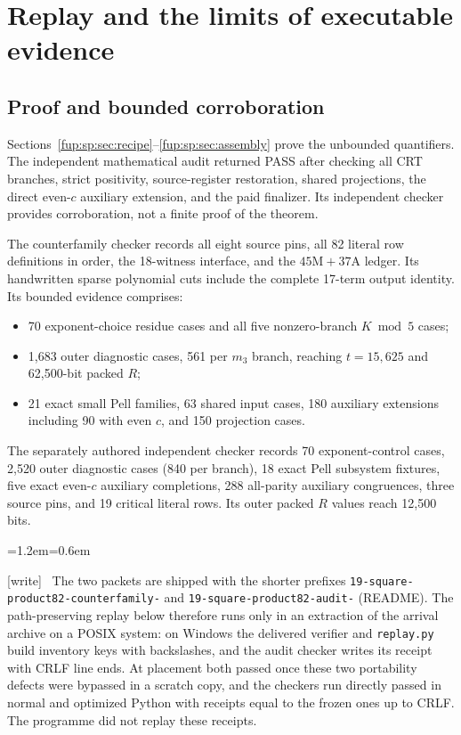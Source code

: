 \documentclass[11pt,letterpaper]{article}
\theoremstyle{definition}\newtheorem{definition}[theorem]{Definition}
\theoremstyle{remark}\newtheorem{remark}[theorem]{Remark}
\newcommand{\wtag}{\textup{[write]}}
\newenvironment{writenote}{\par\smallskip\begin{list}{}{\leftmargin=1.2em\rightmargin=0.6em}\item[]\small\wtag\ }{\end{list}\smallskip}
\newcommand{\rw}[1]{\nolinkurl{#1}}%
\begin{document}
\section{Replay and the limits of executable evidence}
\label{fup:sp:app:replay}
\subsection{Proof and bounded corroboration}
Sections~\ref{fup:sp:sec:recipe}--\ref{fup:sp:sec:assembly} prove the unbounded
quantifiers. The independent mathematical audit returned PASS after
checking all CRT branches, strict positivity, source-register
restoration, shared projections, the direct even-$c$ auxiliary extension,
and the paid finalizer. Its independent checker provides corroboration,
not a finite proof of the theorem.

The counterfamily checker records all eight source pins, all 82
literal row definitions in order, the 18-witness interface, and the
$45\mathrm M+37\mathrm A$ ledger. Its handwritten sparse polynomial
cuts include the complete 17-term output identity. Its bounded evidence
comprises:
\begin{itemize}
\item 70 exponent-choice residue cases and all five nonzero-branch
$K\bmod5$ cases;
\item 1,683 outer diagnostic cases, 561 per $m_3$ branch, reaching
$t=15{,}625$ and 62,500-bit packed $R$;
\item 21 exact small Pell families, 63 shared input cases, 180
auxiliary extensions including 90 with even $c$, and 150 projection cases.
\end{itemize}
The separately authored independent checker records 70 exponent-control
cases, 2,520 outer diagnostic cases (840 per branch), 18 exact Pell
subsystem fixtures, five exact even-$c$ auxiliary completions, 288
all-parity auxiliary congruences, three source pins, and 19 critical
literal rows. Its outer packed $R$ values reach 12,500 bits.
\begin{writenote}
The two packets are shipped with the shorter prefixes \texttt{19-square-product82-counterfamily-} and \texttt{19-square-product82-audit-} (README). The path-preserving replay below therefore runs only in an extraction of the arrival archive on a POSIX system: on Windows the delivered verifier and \rw{replay.py} build inventory keys with backslashes, and the audit checker writes its receipt with CRLF line ends. At placement both passed once these two portability defects were bypassed in a scratch copy, and the checkers run directly passed in normal and optimized Python with receipts equal to the frozen ones up to CRLF. The programme did not replay these receipts.
\end{writenote}
\end{document}
